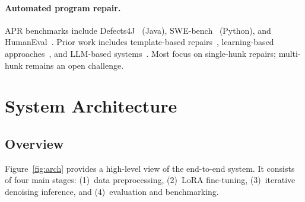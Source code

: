 \documentclass[11pt,a4paper]{article}
\begin{document}
\paragraph{Automated program repair.}
APR benchmarks include Defects4J~\cite{defects4j} (Java), SWE-bench~\cite{swebench} (Python), and HumanEval~\cite{humaneval}. Prior work includes template-based repairs~\cite{genprog}, learning-based approaches~\cite{drrepair}, and LLM-based systems~\cite{chatrepair}. Most focus on single-hunk repairs; multi-hunk remains an open challenge.

\section{System Architecture}

\subsection{Overview}
\label{sec:arch}

Figure~\ref{fig:arch} provides a high-level view of the end-to-end system. It consists of four main stages: (1)~data preprocessing, (2)~LoRA fine-tuning, (3)~iterative denoising inference, and (4)~evaluation and benchmarking.
\end{document}
